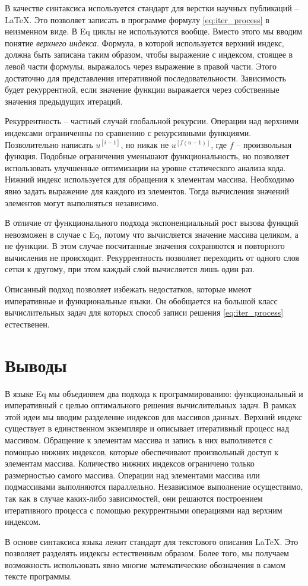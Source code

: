 \documentclass[a4paper]{llncs}
\begin{document}
В качестве синтаксиса используется стандарт для верстки научных публикаций -- \LaTeX. Это позволяет записать в программе формулу \eqref{eq:iter_process} в неизменном виде. В Eq циклы не используются вообще. Вместо этого мы вводим понятие \emph{верхнего индекса}. Формула, в которой используется верхний индекс, должна быть записана таким образом, чтобы выражение с индексом, стоящее в левой части формулы, выражалось через выражение в правой части. Этого достаточно для представления итеративной последовательности. Зависимость будет рекуррентной, если значение функции выражается через собственные значения предыдущих итераций.

Рекуррентность -- частный случай глобальной рекурсии. Операции над верхними индексами ограниченны по сравнению с рекурсивными функциями. Позволительно написать $u^{[i-1]}$, но никак не $u^{[f(u-1)]}$, где $f$ -- произвольная функция. Подобные ограничения уменьшают функциональность, но позволяет использовать улучшенные оптимизации на уровне статического анализа кода.
Нижний индекс используется для обращения к элементам массива. Необходимо явно задать выражение для каждого из элементов. Тогда вычисления значений элементов могут выполняться независимо.

В отличие от функционального подхода экспоненциальный рост вызова функций невозможен в случае с Eq, потому что вычисляется значение массива целиком, а не функции. В этом случае посчитанные значения сохраняются и повторного вычисления не происходит. Рекуррентность позволяет переходить от одного слоя сетки к другому, при этом каждый слой вычисляется лишь один раз.

Описанный подход позволяет избежать недостатков, которые имеют императивные и функциональные языки. Он обобщается на большой класс вычислительных задач для которых способ записи решения \eqref{eq:iter_process} естественен. 

\section*{Выводы}
В языке Eq мы объединяем два подхода к программированию: функциональный и императивный с целью оптимального решения вычислительных задач. В рамках этой идеи мы вводим разделение индексов для массивов данных. Верхний индекс существует в единственном экземпляре и описывает итеративный процесс над массивом. Обращение к элементам массива и запись в них выполняется с помощью нижних индексов, которые обеспечивают произвольный доступ к элементам массива. Количество нижних индексов ограничено только размерностью самого массива. Операции над элементами массива или подмассивами выполняются параллельно. Независимое выполнение осуществимо, так как в случае каких-либо зависимостей, они решаются построением итеративного процесса с помощью рекуррентными операциями над верхним индексом.

В основе синтаксиса языка лежит стандарт для текстового описания \LaTeX. Это позволяет разделять индексы естественным образом. Более того, мы получаем возможность использовать явно многие математические обозначения в самом тексте программы.
\end{document}
